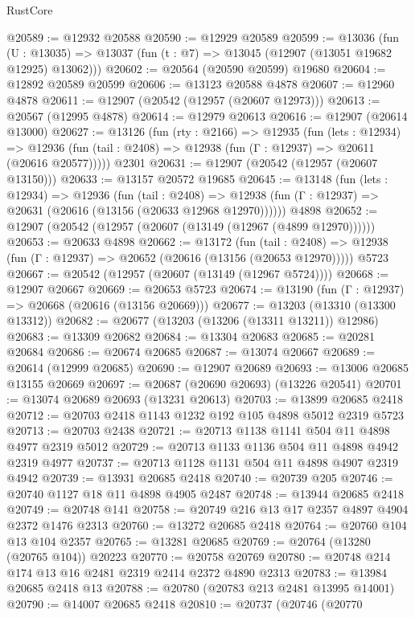 \begin{lexlean}{RustCore}
\begin{coremodule}
@20589 := @12932 @20588
@20590 := @12929 @20589
@20599 := @13036
    (fun (U : @13035) => @13037 (fun (t : @7) => @13045 (@12907 (@13051 @19682 @12925) @13062)))
@20602 := @20564 (@20590 @20599) @19680
@20604 := @12892 @20589 @20599
@20606 := @13123 @20588 @4878
@20607 := @12960 @4878
@20611 := @12907 (@20542 (@12957 (@20607 @12973)))
@20613 := @20567 (@12995 @4878)
@20614 := @12979 @20613
@20616 := @12907 (@20614 @13000)
@20627 := @13126
    (fun (rty : @2166) =>
    @12935
      (fun (lets : @12934) =>
      @12936 (fun (tail : @2408) => @12938 (fun (Γ : @12937) => @20611 (@20616 @20577)))))
    @2301
@20631 := @12907 (@20542 (@12957 (@20607 @13150)))
@20633 := @13157 @20572 @19685
@20645 := @13148
    (fun (lets : @12934) =>
    @12936
      (fun (tail : @2408) =>
      @12938 (fun (Γ : @12937) => @20631 (@20616 (@13156 (@20633 @12968 @12970))))))
    @4898
@20652 := @12907 (@20542 (@12957 (@20607 (@13149 (@12967 (@4899 @12970))))))
@20653 := @20633 @4898
@20662 := @13172
    (fun (tail : @2408) => @12938 (fun (Γ : @12937) => @20652 (@20616 (@13156 (@20653 @12970)))))
    @5723
@20667 := @20542 (@12957 (@20607 (@13149 (@12967 @5724))))
@20668 := @12907 @20667
@20669 := @20653 @5723
@20674 := @13190 (fun (Γ : @12937) => @20668 (@20616 (@13156 @20669)))
@20677 := @13203 (@13310 (@13300 @13312))
@20682 := @20677 (@13203 (@13206 (@13311 @13211)) @12986)
@20683 := @13309 @20682
@20684 := @13304 @20683
@20685 := @20281 @20684
@20686 := @20674 @20685
@20687 := @13074 @20667
@20689 := @20614 (@12999 @20685)
@20690 := @12907 @20689
@20693 := @13006 @20685 @13155 @20669
@20697 := @20687 (@20690 @20693) (@13226 @20541)
@20701 := @13074 @20689 @20693 (@13231 @20613)
@20703 := @13899 @20685 @2418
@20712 := @20703 @2418 @1143 @1232 @192 @105 @4898 @5012 @2319 @5723
@20713 := @20703 @2438
@20721 := @20713 @1138 @1141 @504 @11 @4898 @4977 @2319 @5012
@20729 := @20713 @1133 @1136 @504 @11 @4898 @4942 @2319 @4977
@20737 := @20713 @1128 @1131 @504 @11 @4898 @4907 @2319 @4942
@20739 := @13931 @20685 @2418
@20740 := @20739 @205
@20746 := @20740 @1127 @18 @11 @4898 @4905 @2487
@20748 := @13944 @20685 @2418
@20749 := @20748 @141
@20758 := @20749 @216 @13 @17 @2357 @4897 @4904 @2372 @1476 @2313
@20760 := @13272 @20685 @2418
@20764 := @20760 @104 @13 @104 @2357
@20765 := @13281 @20685
@20769 := @20764 (@13280 (@20765 @104)) @20223
@20770 := @20758 @20769
@20780 := @20748 @214 @174 @13 @16 @2481 @2319 @2414 @2372 @4890 @2313
@20783 := @13984 @20685 @2418 @13
@20788 := @20780 (@20783 @213 @2481 @13995 @14001)
@20790 := @14007 @20685 @2418
@20810 := @20737
    (@20746
      (@20770

\end{coremodule}
\end{lexlean}
